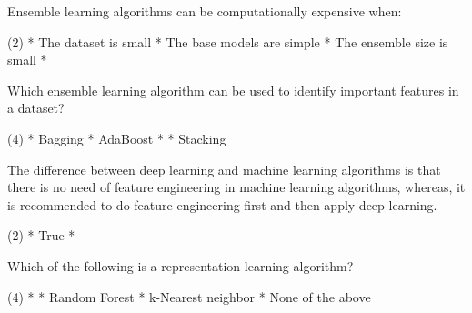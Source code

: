 \documentclass[10pt]{extarticle}
\begin{document}
\begin{exercise}
    Ensemble learning algorithms can be computationally expensive when:
    \begin{choice} (2)
        * The dataset is small
        * The base models are simple
        * The ensemble size is small
        * 
    \end{choice}
\end{exercise}
\begin{solution}
\end{solution}

\begin{exercise}
    Which ensemble learning algorithm can be used to identify important features in a dataset?
    \begin{choice} (4)
        * Bagging
        * AdaBoost
        * 
        * Stacking
    \end{choice}
\end{exercise}
\begin{solution}
\end{solution}

\begin{exercise}
    The difference between deep learning and machine learning algorithms is that there is no need of feature engineering in machine learning algorithms, whereas, it is recommended to do feature engineering first and then apply deep learning.
    \begin{choice} (2)
        * True
        * 
    \end{choice}
\end{exercise}
\begin{solution}
\end{solution}

\begin{exercise}
    Which of the following is a representation learning algorithm?
    \begin{choice} (4)
        * 
        * Random Forest
        * k-Nearest neighbor
        * None of the above
    \end{choice}
\end{exercise}
\begin{solution}
\end{solution}
\end{document}
